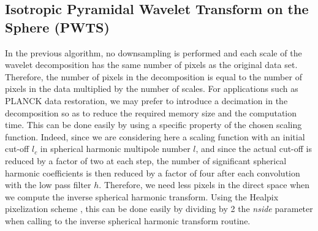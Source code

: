 \subsection{Isotropic Pyramidal Wavelet Transform on the Sphere (PWTS) }


In the previous algorithm, no downsampling is performed and each scale of the wavelet decomposition has the same number of pixels as 
the original data set. Therefore, the number of pixels in the decomposition is equal to the number of pixels in the data multiplied 
by the number of scales. For applications such as PLANCK data restoration, we may prefer to introduce a decimation in the decomposition 
so as to reduce the required memory size and the computation time. This can be done easily by using a specific property of the chosen 
scaling function. Indeed, since we are considering here a scaling function with an initial cut-off $l_c$ in spherical harmonic multipole 
number $l$, and since the actual cut-off is reduced by a factor of two at each step, the number of significant spherical harmonic 
coefficients is then reduced by a factor of four after each convolution with the low pass filter $h$. Therefore, we need less pixels 
in the direct space when we compute the inverse spherical harmonic transform. Using the Healpix pixelization scheme \cite{healpix}, 
this can be done easily by dividing by 2 the {\it nside} parameter when calling to the inverse spherical harmonic transform routine.

